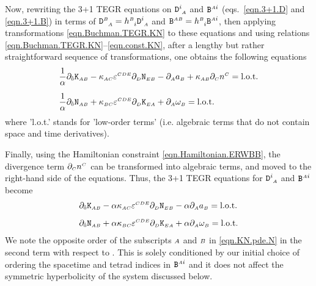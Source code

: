 \documentclass[
10pt, %
a4paper, %
oneside, %
twocolumn,
headinclude,footinclude, %
BCOR5mm, %
]{scrartcl}
\newcommand{\sA}{\mathsmaller A}
\newcommand{\sB}{\mathsmaller B}
\newcommand{\sC}{\mathsmaller C}
\newcommand{\sD}{\mathsmaller D}
\newcommand{\sE}{\mathsmaller E}
\newcommand{\pd}[1]{\partial_{#1}}
\newcommand{\mg}[1]{\kappa_{#1}}			%
\newcommand{\tetrsymbol}{h}
\newcommand{\tetr}[2]{\tetrsymbol^{#1}_{\phantom{#1}#2}}
\newcommand{\Dfin}[2]{\mathtt{D}_{\phantom{#2}#1}^{#2}}	%
\newcommand{\Kbuch}[2]{\mathtt{K}_{{#1}{#2}}}	%
\newcommand{\Nbuchdown}[2]{\mathtt{N}_{#1#2}}	%
\newcommand{\Bfin}[2]{\mathtt{B}^{#1#2}}	%
\newcommand{\LCtens}{\varepsilon} %
\newcommand{\indalg}[1]{\hat{\mathsmaller{#1}}}
\newcommand{\lapse}{\alpha}
\begin{document}
	Now, rewriting the 3+1 TEGR equations on $\Dfin{\sA}{i}$ and $\Bfin{\sA}{i}$
	(eqs.~\eqref{eqn.3+1.D} and \eqref{eqn.3+1.B}) in terms of $\Dfin{\sA}{\sB}
	= \tetr{\sB}{i}\Dfin{\sA}{i}$ and $\Bfin{\sA}{\sB} =
	\tetr{\sB}{i}\Bfin{\sA}{i}$, then applying transformations
	\eqref{eqn.Buchman.TEGR.KN} to these equations and using relations
	\eqref{eqn.Buchman.TEGR.KN}--\eqref{eqn.const.KN}, after a lengthy but
	rather straightforward sequence of transformations, one obtains the following equations
		\begin{subequations}\label{eqn.KN.pde0}
		\begin{align}
			\frac{1}{\lapse}\pd{\indalg{0}} \Kbuch{\sA}{\sB}
			&
			- \mg{\sA\sC}\LCtens^{\sC\sD\sE} \pd{\sD} \Nbuchdown{\sE}{\sB}
			- \pd{\sA} a_{\sB}  + \mg{\sA\sB} \pd{\sC} n^\sC = \text{l.o.t.}
			\\[2mm]
			\frac{1}{\lapse}\pd{\indalg{0}} \Nbuchdown{\sA}{\sB}
			&
			+ \mg{\sB\sC}\LCtens^{\sC\sD\sE} \pd{\sD} \Kbuch{\sE}{\sA}
			+ \pd{\sA} \omega_{\sB} = \text{l.o.t.}
			\label{eqn.KN.pde.N}
		\end{align}
	\end{subequations}
	where 'l.o.t.' stands for 'low-order terms' (i.e. algebraic terms that do
	not contain space and time derivatives).

	Finally, using the Hamiltonian constraint \eqref{eqn.Hamiltonian.ERWBB}, the
	divergence term $\pd{\sC}n^\sC$ can be transformed into algebraic terms, and
	moved to the right-hand side of the equations. Thus, the 3+1 TEGR equations
	for $\Dfin{\sA}{i}$ and $\Bfin{\sA}{i}$ become
	\begin{subequations}\label{eqn.KN.pde}
		\begin{align}
			\pd{\indalg{0}} \Kbuch{\sA}{\sB}
			&
			- \alpha \mg{\sA\sC}\LCtens^{\sC\sD\sE} \pd{\sD} \Nbuchdown{\sE}{\sB}
			- \alpha \pd{\sA} a_{\sB} = \text{l.o.t.}
			\\[2mm]
			\pd{\indalg{0}} \Nbuchdown{\sA}{\sB}
			&
			+ \alpha \mg{\sB\sC}\LCtens^{\sC\sD\sE} \pd{\sD} \Kbuch{\sE}{\sA}
			+ \alpha \pd{\sA} \omega_{\sB} = \text{l.o.t.}
			\label{eqn.KN.pde.N}
		\end{align}
	\end{subequations}
	We note the opposite order of the subscripts $\sA$ and $\sB$ in
	\eqref{eqn.KN.pde.N} in the second term with respect to
	\cite[eq.(40)]{Buchman2003}. This is solely conditioned by our initial
	choice of ordering the spacetime and tetrad indices in $\Bfin{\sA}{i}$ and
	it does not affect the symmetric hyperbolicity of the system discussed
	below.
\end{document}
